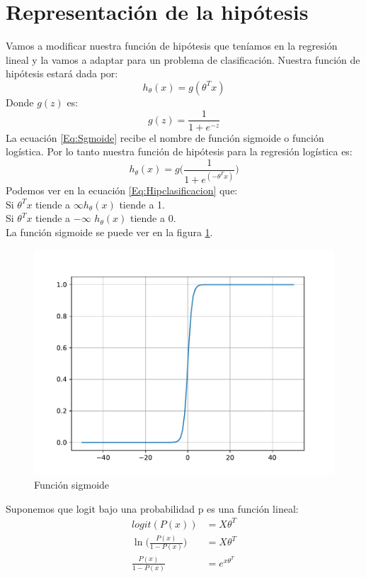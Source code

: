 \documentclass{report}
\begin{document}
\section{Representación de la hipótesis}
Vamos a modificar nuestra función de hipótesis que teníamos en la regresión lineal y la vamos a adaptar para un problema de clasificación. Nuestra función de hipótesis estará dada por:
\begin{equation}
	h_\theta(x)=g(\theta^Tx)
	\label{Eq:Hipclas}
\end{equation}
Donde $g(z)$ es:
\begin{equation}
	g(z)=\frac{1}{1+e^{-z}}
	\label{Eq:Sgmoide}
\end{equation}
La ecuación \ref{Eq:Sgmoide} recibe el nombre de función sigmoide o función logística. Por lo tanto nuestra función de hipótesis para la regresión logística es:
\begin{equation}
	h_\theta(x)=g\Big(\frac{1}{1+e^{(-\theta^Tx)}}\Big)
	\label{Eq:Hipclasificacion}
\end{equation}
Podemos ver en la ecuación \ref{Eq:Hipclasificacion} que:\\ Si $\theta^Tx$ tiende a $\infty$$ h_\theta(x) $ tiende a 1.\\ Si $ \theta^Tx $ tiende a $-\infty$ $ h_\theta(x) $ tiende a 0.\\La función sigmoide se puede ver en la figura \ref{Fig:Sig}. 
\begin{figure}[h]
	\centering
	\includegraphics[scale=0.5]{img/sigmoide}
	\caption{Función sigmoide}
	\label{Fig:Sig}
\end{figure}
Suponemos que logit bajo una probabilidad p es una función lineal:
\begin{align*}
logit(P(x)) &= X\theta^T\\
\ln\Bigg(\frac{P(x)}{1-P(x)}\Bigg) &=X\theta^T\\
\frac{P(x)}{1-P(x)}&=e^{x\theta^T}
\end{align*}
\end{document}
